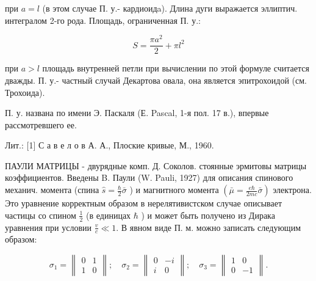 \documentclass[10pt]{article}
\begin{document}
при $a=l$ (в этом случае П. у.- кардиоидa). Длина дуги выражается эллиптич. интегралом 2-го рода. Площадь, ограниченная П. у.:



\[

S=\frac{\pi a^{2}}{2}+\pi l^{2}

\]



при $a>l$ площадь внутренней петли при вычислении по этой формуле считается дважды. П. у.- частный случай Декартова овала, она является эпитрохоидой (см. Трохоида).



П. у. названа по имени Э. Паскаля (Е. Pascal, 1-я пол. 17 в.), впервые рассмотревшего ее.



Лит.: [1] С а в е л о в А. А., Плоские кривые, М., 1960.



ПАУЛИ МАТРИЦЫ - двурядные комп. Д. Соколов. стоянные эрмитовы матрицы коэффициентов. Введены B. Паули (W. Pauli, 1927) для описания спинового механич. момента (спина $\hat{s}=\frac{\hbar}{2} \bar{\sigma}$ ) и магнитного момента $\left(\bar{\mu}=\frac{e \hbar}{2 m c} \bar{\sigma}\right)$ электрона. Это уравнение корректным образом в нерелятивистском случае описывает частицы со спином $\frac{1}{2}$ (в единицах $\hbar$ ) и может быть получено из Дирака уравнения при условии $\frac{v}{c} \ll 1$. В явном виде П. м. можно записать следующим образом:



\[

\sigma_{1}=\left\|\begin{array}{ll}

0 & 1 \\

1 & 0

\end{array}\right\| ; \quad \sigma_{2}=\left\|\begin{array}{rr}

0 & -i \\

i & 0

\end{array}\right\| ; \quad \sigma_{3}=\left\|\begin{array}{rr}

1 & 0 \\

0 & -1

\end{array}\right\| .

\]
\end{document}
